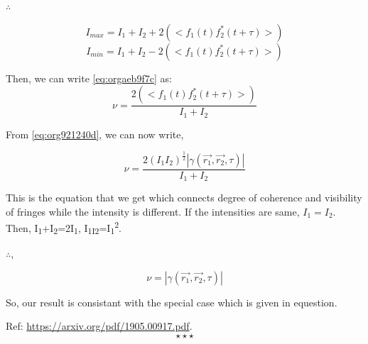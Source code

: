 \documentclass[a4paper,11pt]{article}
\begin{document}
\(\therefore\)

$$I_{max} = I_1+I_2+2(<f_1(t)f_2^*(t+\tau)>)$$
$$I_{min} = I_1+I_2-2(<f_1(t)f_2^*(t+\tau)>)$$

Then, we can write \ref{eq:orgaeb9f7c} as:
\begin{equation}
\label{eq:orgc82c953}
\nu = \frac{2(<f_1(t)f_2^*(t+\tau)>)}{I_1+I_2}
\end{equation}

From \ref{eq:org921240d}, we can now write,

\begin{equation}
\label{eq:org4785aa3}
\nu = \frac{2(I_1I_2)^{\frac{1}{2}}|\gamma(\vec{r_1},\vec{r_2},\tau)|}{I_1+I_2}
\end{equation}

This is the equation that we get which connects degree of coherence and visibility of fringes while the intensity is different. If the intensities are same, \(I_1=I_2\). Then, I\textsubscript{1}+I\textsubscript{2}=2I\textsubscript{1}, I\textsubscript{1I}\textsubscript{2}=I\textsubscript{1}\textsuperscript{2}.

\(\therefore\),

$$\nu = |\gamma(\vec{r_1},\vec{r_2},\tau)|$$

So, our result is consistant with the special case which is given in equestion.

Ref: \url{https://arxiv.org/pdf/1905.00917.pdf}.
$$\star\star\star$$
\end{document}
